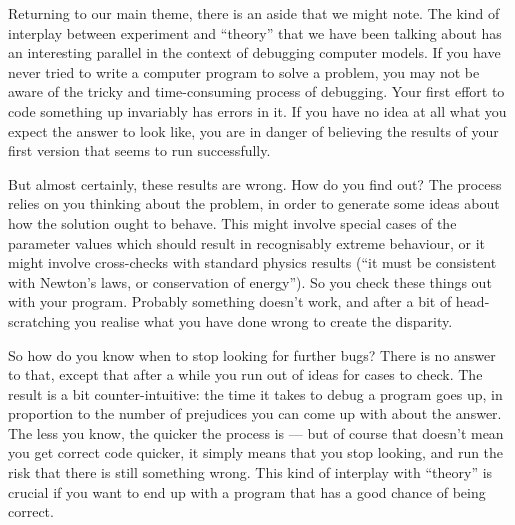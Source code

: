 
  Returning to our main theme, there is an aside that we might note. The kind 
  of interplay between experiment and “theory” that we have been talking about 
  has an interesting parallel in the context of debugging computer models. If 
  you have never tried to write a computer program to solve a problem, you may 
  not be aware of the tricky and time-consuming process of debugging. Your 
  first effort to code something up invariably has errors in it. If you have no 
  idea at all what you expect the answer to look like, you are in danger of 
  believing the results of your first version that seems to run successfully. 

  But almost certainly, these results are wrong. How do you find out? The 
  process relies on you thinking about the problem, in order to generate some 
  ideas about how the solution ought to behave. This might involve special 
  cases of the parameter values which should result in recognisably extreme 
  behaviour, or it might involve cross-checks with standard physics results 
  (“it must be consistent with Newton’s laws, or conservation of energy”). So 
  you check these things out with your program. Probably something doesn’t 
  work, and after a bit of head-scratching you realise what you have done wrong 
  to create the disparity. 

  So how do you know when to stop looking for further bugs? There is no answer 
  to that, except that after a while you run out of ideas for cases to check. 
  The result is a bit counter-intuitive: the time it takes to debug a program 
  goes up, in proportion to the number of prejudices you can come up with about 
  the answer. The less you know, the quicker the process is — but of course 
  that doesn’t mean you get correct code quicker, it simply means that you stop 
  looking, and run the risk that there is still something wrong. This kind of 
  interplay with “theory” is crucial if you want to end up with a program that 
  has a good chance of being correct. 


